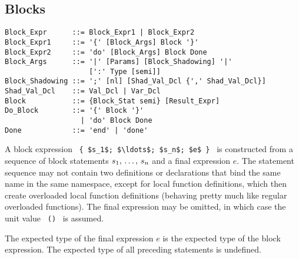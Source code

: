 \subsection{Blocks}
\label{sec:blocks}

\syntax\begin{lstlisting}
Block_Expr      ::= Block_Expr1 | Block_Expr2
Block_Expr1     ::= '{' [Block_Args] Block '}'
Block_Expr2     ::= 'do' [Block_Args] Block Done
Block_Args      ::= '|' [Params] [Block_Shadowing] '|' 
                    [':' Type [semi]]
Block_Shadowing ::= ';' [nl] [Shad_Val_Dcl {',' Shad_Val_Dcl}]
Shad_Val_Dcl    ::= Val_Dcl | Var_Dcl
Block           ::= {Block_Stat semi} [Result_Expr]
Do_Block        ::= '{' Block '}' 
                  | 'do' Block Done
Done            ::= 'end' | 'done'
\end{lstlisting}

A block expression ~\lstinline!{ $s_1$; $\ldots$; $s_n$; $e$ }!~ is constructed from a sequence of block statements $s_1 ,\, \ldots ,\, s_n$ and a final expression $e$. The statement sequence may not contain two definitions or declarations that bind the same name in the same namespace, except for local function definitions, which then create overloaded local function definitions (behaving pretty much like regular overloaded functions). The final expression may be omitted, in which case the unit value ~\lstinline!()!~ is assumed. 

The expected type of the final expression $e$ is the expected type of the block expression. The expected type of all preceding statements is undefined. 

